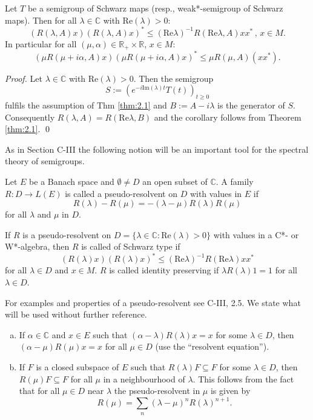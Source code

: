 \begin{corollary}\label{cor:2.3}
Let $ T $ be a semigroup of Schwarz maps (resp., weak*-semigroup of Schwarz maps).
Then for all $ \lambda \in \mathbb{C} $ with $ \text{Re}(\lambda) > 0 $:
\[
(R(\lambda,A)x)(R(\lambda,A)x)^* \leq (\text{Re}\lambda)^{-1} R(\text{Re}\lambda,A)xx^* \, , \, x \in M .
\]
In particular for all $ (\mu,\alpha) \in \mathbb{R}_+ \times \mathbb{R} $, $ x \in M $:
\[
(\mu R(\mu+i\alpha,A)x)(\mu R(\mu+i\alpha,A)x)^* \leq \mu R(\mu,A)(xx^*).
\]
\end{corollary}

\begin{proof}
Let $ \lambda \in \mathbb{C} $ with $ \text{Re}(\lambda) > 0 $.
Then the semigroup
\[
S := (e^{-i\text{Im}(\lambda)t}T(t))_{t\geq0}
\]
fulfils the assumption of Thm \ref{thm:2.1} and $ B := A - i\lambda $ is the generator of $ S $.
Consequently $ R(\lambda,A) = R(\text{Re}\lambda,B) $ and the corollary follows from Theorem \ref{thm:2.1}.
\qed
\end{proof}

As in Section C-III the following notion will be an important tool for the spectral theory of semigroups.

\begin{definition}\label{def:2.3}
Let $ E $ be a Banach space and $ \emptyset \neq D $ an open subset of $ \mathbb{C} $.
A family $ R: D \to L(E) $ is called a pseudo-resolvent on $ D $ with values in $ E $ if
\[
R(\lambda) - R(\mu) = -(\lambda - \mu)R(\lambda)R(\mu)
\]
for all $ \lambda $ and $ \mu $ in $ D $.
\end{definition}


If $ R $ is a pseudo-resolvent on $ D = \{\lambda \in \mathbb{C} : \text{Re}(\lambda) > 0\} $ with values in a C*- or W*-algebra, then $ R $ is called of Schwarz type if
\[
(R(\lambda)x)(R(\lambda)x)^* \leq (\text{Re}\lambda)^{-1} R(\text{Re}\lambda)xx^*
\]
for all $ \lambda \in D $ and $ x \in M $.
$ R $ is called identity preserving if $ \lambda R(\lambda)1 = 1 $ for all $ \lambda \in D $.

For examples and properties of a pseudo-resolvent see C-III, 2.5.
We state what will be used without further reference.

\begin{enumerate}[(a)]
\item 
If $ \alpha \in \mathbb{C} $ and $ x \in E $ such that $ (\alpha - \lambda)R(\lambda)x = x $ for some $ \lambda \in D $, then $ (\alpha - \mu)R(\mu)x = x $ for all $ \mu \in D $ (use the \enquote{resolvent equation}).

\item 
If $ F $ is a closed subspace of $ E $ such that $ R(\lambda)F \subseteq F $ for some $ \lambda \in D $, then $ R(\mu)F \subseteq F $ for all $ \mu $ in a neighbourhood of $ \lambda $.
This follows from the fact that for all $ \mu \in D $ near $ \lambda $ the pseudo-resolvent in $ \mu $ is given by
\[
R(\mu) = \sum_n (\lambda - \mu)^n R(\lambda)^{n+1}.
\]
\end{enumerate}

